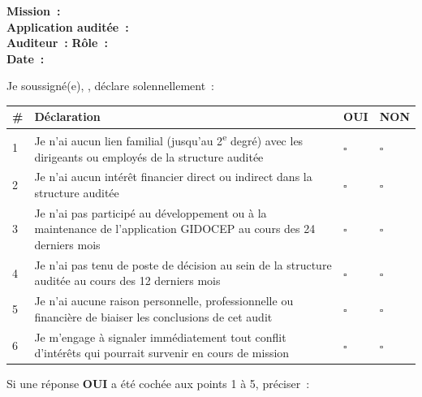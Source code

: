 \documentclass[12pt,a4paper,oneside]{report}
\begin{document}
\begin{goldbox}[title={\color{navy}\bfseries D\'ECLARATION D'IND\'EPENDANCE ET D'OBJECTIVIT\'E : MUSA (IIA~1100)}]
\small
\textbf{Mission~:} \dotfill \\[4pt]
\textbf{Application audit\'ee~:} \dotfill \\[4pt]
\textbf{Auditeur~:} \dotfill \quad \textbf{R\^ole~:} \dotfill \\[4pt]
\textbf{Date~:} \dotfill
\end{goldbox}

\vspace{0.3cm}

Je soussign\'e(e), \dotfill, d\'eclare solennellement~:

\vspace{0.3cm}

\begin{longtable}{|p{0.7cm}|p{11cm}|p{1.2cm}|p{1.2cm}|}
\hline
\rowcolor{theadcolor}
\color{white}\textbf{\#} &
\color{white}\textbf{D\'eclaration} &
\color{white}\textbf{OUI} &
\color{white}\textbf{NON} \\
\hline\endhead\hline\endfoot
\rowcolor{trow1}
1 & Je n'ai aucun lien familial (jusqu'au 2\textsuperscript{e} degr\'e) avec les dirigeants ou employ\'es de la structure audit\'ee & $\square$ & $\square$ \\
\hline\rowcolor{trow2}
2 & Je n'ai aucun int\'er\^et financier direct ou indirect dans la structure audit\'ee & $\square$ & $\square$ \\
\hline\rowcolor{trow1}
3 & Je n'ai pas particip\'e au d\'eveloppement ou \`a la maintenance de l'application GIDOCEP au cours des 24 derniers mois & $\square$ & $\square$ \\
\hline\rowcolor{trow2}
4 & Je n'ai pas tenu de poste de d\'ecision au sein de la structure audit\'ee au cours des 12 derniers mois & $\square$ & $\square$ \\
\hline\rowcolor{trow1}
5 & Je n'ai aucune raison personnelle, professionnelle ou financi\`ere de biaiser les conclusions de cet audit & $\square$ & $\square$ \\
\hline\rowcolor{trow2}
6 & Je m'engage \`a signaler imm\'ediatement tout conflit d'int\'er\^ets qui pourrait survenir en cours de mission & $\square$ & $\square$ \\
\hline
\end{longtable}

\vspace{0.5cm}

Si une r\'eponse \textbf{OUI} a \'et\'e coch\'ee aux points 1 \`a 5, pr\'eciser~:
\end{document}
